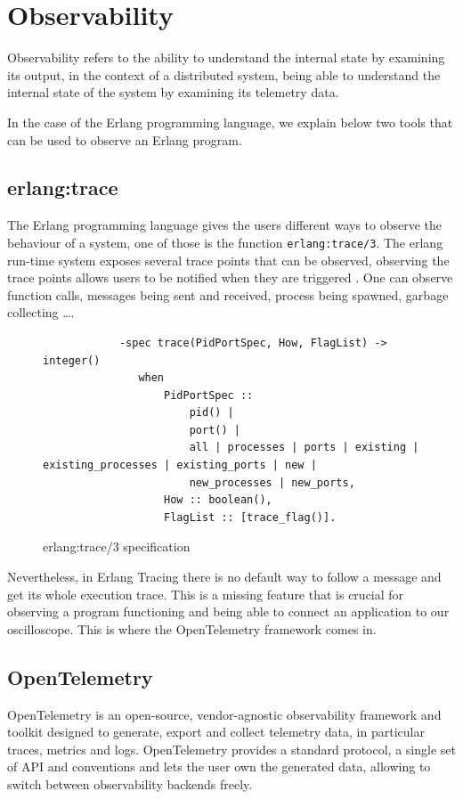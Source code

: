 \section{Observability}
        Observability refers to the ability to understand the internal state by examining its output, in the context of a distributed system, being able to understand the internal state of the system by examining its telemetry data. \cite{otel-o}

    In the case of the Erlang programming language, we explain below two tools that can be used to observe an Erlang program.
    
    \subsection{erlang:trace}
        The Erlang programming language gives the users different ways to observe the behaviour of a system, one of those is the function \texttt{erlang:trace/3}. The erlang run-time system exposes several trace points that can be observed, observing the trace points allows users to be notified when they are triggered \cite{erl-t}. One can observe function calls, messages being sent and received, process being spawned, garbage collecting \dots. 
        \begin{figure}[!ht]
        \centering
        \begin{verbatim}
            -spec trace(PidPortSpec, How, FlagList) -> integer()
               when
                   PidPortSpec ::
                       pid() |
                       port() |
                       all | processes | ports | existing | existing_processes | existing_ports | new |
                       new_processes | new_ports,
                   How :: boolean(),
                   FlagList :: [trace_flag()].
        \end{verbatim}
        \caption{erlang:trace/3 specification}
\end{figure}

    Nevertheless, in Erlang Tracing there is no default way to follow a message and get its whole execution trace. This is a missing feature that is crucial for observing a program functioning and being able to connect an application to our oscilloscope.  This is where the OpenTelemetry framework comes in.

\subsection{OpenTelemetry}
    OpenTelemetry is an open-source, vendor-agnostic observability framework and toolkit designed to generate, export and collect telemetry data, in particular traces, metrics and logs. OpenTelemetry provides a standard protocol, a single set of API and conventions and lets the user own the generated data, allowing to switch between observability backends freely. \cite{otel-o}
   
